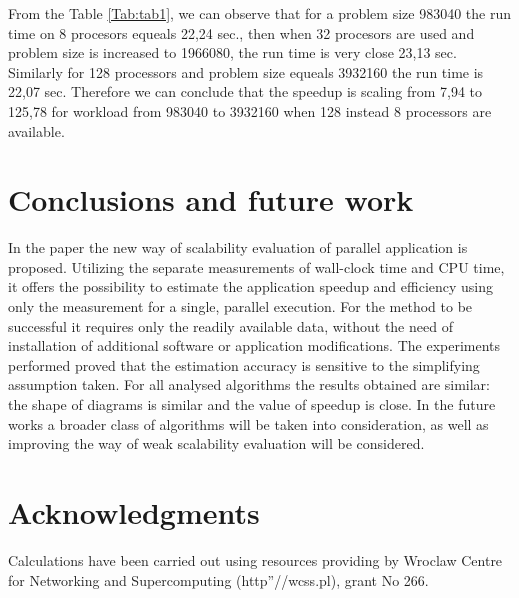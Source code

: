 \documentclass[runningheads]{llncs}
\begin{document}
From the Table \ref{Tab:tab1}, we can observe that for a problem size 983040 the run time on 8 procesors equeals 22,24 sec., then when 32 procesors are used and problem size is increased to 1966080, the run time is very close 23,13 sec. Similarly for 128 processors and problem size equeals 3932160 the run time is 22,07 sec. Therefore we can conclude that the speedup is scaling from 7,94 to 125,78  for workload from 983040 to 3932160 when 128 instead 8 processors are available. 

\section{Conclusions and future work}

In the paper the new way of scalability evaluation of parallel application is proposed. Utilizing the separate measurements of wall-clock time and CPU time, it offers the possibility to estimate the application speedup and efficiency using only the measurement for a single, parallel execution. For the method to be successful it requires only the readily available data, without the need of installation of additional software or application modifications. The experiments performed proved that the estimation accuracy is sensitive to the simplifying assumption taken. For all analysed algorithms the results obtained are similar: the shape of diagrams is similar and the value of speedup is close. In the future works a broader class of algorithms will be taken into consideration, as well as improving the way of weak scalability evaluation will be considered.



\section*{Acknowledgments}

Calculations have been carried out using resources providing by Wroclaw Centre for Networking and Supercomputing (http”//wcss.pl), grant No 266.
\end{document}
